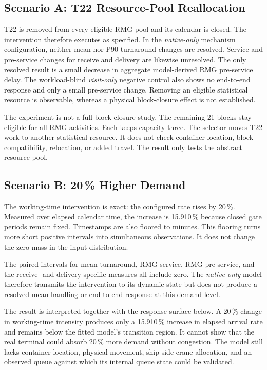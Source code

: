 \subsection{Scenario A: T22 Resource-Pool Reallocation}

T22 is removed from every eligible RMG pool and its calendar is closed. The
intervention therefore executes as specified. In the \textit{native-only}
 mechanism configuration, neither mean nor P90 turnaround changes are resolved. Service
and pre-service changes for receive and delivery are likewise unresolved. The
only resolved result is a small decrease in aggregate model-derived RMG
pre-service delay. The workload-blind \textit{visit-only} negative control also
shows no end-to-end response and only a small pre-service change. Removing an
eligible statistical resource is observable, whereas a physical block-closure
effect is not established.

The experiment is not a full block-closure study. The remaining 21 blocks stay
eligible for all RMG activities. Each keeps capacity three. The selector moves
T22 work to another statistical resource. It does not check container
location, block compatibility, relocation, or added travel. The result only
tests the abstract resource pool.

\subsection{Scenario B: 20\,\% Higher Demand}

The working-time intervention is exact: the configured rate rises by 20\,\%.
Measured over elapsed calendar time, the increase is 15.910\,\% because closed
gate periods remain fixed. Timestamps are also floored to minutes. This
flooring turns more short positive intervals into simultaneous observations.
It does not change the zero mass in the input distribution.

The paired intervals for mean turnaround, RMG service, RMG pre-service, and the
receive- and delivery-specific measures all include zero. The
\textit{native-only} model therefore transmits the intervention to its dynamic
state but does not produce a resolved mean handling or end-to-end response at
this demand level.

The result is interpreted together with the response surface below. A 20\,\%
change in working-time intensity produces only a 15.910\,\% increase in
elapsed arrival rate and remains below the fitted model's transition region.
It cannot show that the real terminal could absorb 20\,\% more demand without
congestion. The model still lacks container location, physical movement,
ship-side crane allocation, and an observed queue against which its internal
queue state could be validated.

